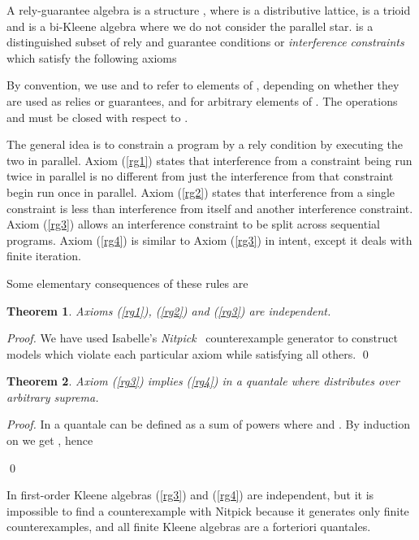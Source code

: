 \documentclass{llncs}
\newtheorem{thm}{Theorem}
\begin{document}
A rely-guarantee algebra is a structure
, where 
is a distributive lattice,  is a trioid and
 is a bi-Kleene algebra
where we do not consider the parallel star.  is a distinguished
subset of rely and guarantee conditions or \emph{interference
  constraints} which satisfy the following axioms

By convention, we use  and  to refer to elements of ,
depending on whether they are used as relies or guarantees, and
 for arbitrary elements of . The operations  and 
must be closed with respect to .

The general idea is to constrain a program by a rely condition by
executing the two in parallel. Axiom (\ref{rg1}) states that
interference from a constraint being run twice in parallel is no
different from just the interference from that constraint begin run
once in parallel. Axiom (\ref{rg2}) states that interference from a
single constraint is less than interference from itself and another
interference constraint. Axiom (\ref{rg3}) allows an interference
constraint to be split across sequential programs. Axiom (\ref{rg4})
is similar to Axiom (\ref{rg3}) in intent, except it deals with finite
iteration.

Some elementary consequences of these rules are


\begin{thm}
  Axioms (\ref{rg1}), (\ref{rg2}) and (\ref{rg3}) are independent.
\end{thm}
\begin{proof}
  We have used Isabelle's
  \emph{Nitpick}~\cite{blanchette_nitpick:_2010} counterexample
  generator to construct models which violate each particular axiom
  while satisfying all others. \qed
\end{proof}

\begin{thm}
  Axiom (\ref{rg3}) implies (\ref{rg4}) in a quantale
  where  distributes over arbitrary suprema.
\end{thm}
\begin{proof}
  In a quantale  can be defined as a sum of powers
   where  and . By
  induction on  we get , hence
  
  \qed
\end{proof}

In first-order Kleene algebras (\ref{rg3}) and (\ref{rg4}) are
independent, but it is impossible to find a counterexample with
Nitpick because it generates only finite counterexamples, and all
finite Kleene algebras are a forteriori quantales.
\end{document}
